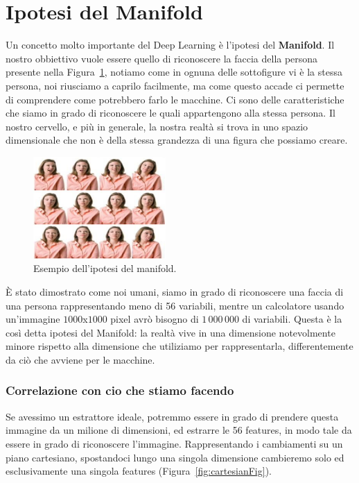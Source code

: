 \section{Ipotesi del Manifold}
Un concetto molto importante del Deep Learning è l'ipotesi del \textbf{Manifold}. Il nostro obbiettivo vuole essere quello di riconoscere la faccia della persona presente nella Figura~\ref{fig:manifold}, notiamo come in ognuna delle sottofigure vi è la stessa persona, noi riusciamo a caprilo facilmente, ma come questo accade ci permette di comprendere come potrebbero farlo le macchine. Ci sono delle caratteristiche che siamo in grado di riconoscere le quali appartengono alla stessa persona. Il nostro cervello, e più in generale, la nostra realtà si trova in uno spazio dimensionale che non è della stessa grandezza di una figura che possiamo creare.

\begin{figure}[h]
    \centering
    \includegraphics[width=0.45\textwidth]{figure/Manifold.png}
    \caption{Esempio dell'ipotesi del manifold.}
    \label{fig:manifold}
\end{figure}


È stato dimostrato come noi umani, siamo in grado di riconoscere una faccia di una persona rappresentando meno di 56 variabili, mentre un calcolatore usando un'immagine $1000$x$1000$ pixel avrò bisogno di $1\,000\,000$ di variabili. Questa è la così detta ipotesi del Manifold: la realtà vive in una dimensione notevolmente minore rispetto alla dimensione che utiliziamo per rappresentarla, differentemente da ciò che avviene per le macchine. 

\subsubsection{Correlazione con cio che stiamo facendo}
Se avessimo un estrattore ideale, potremmo essere in grado di prendere questa immagine da un milione di dimensioni, ed estrarre le 56 features, in modo tale da essere in grado di riconoscere l'immagine. Rappresentando i cambiamenti su un piano cartesiano, spostandoci lungo una singola dimensione cambieremo solo ed esclusivamente una singola features (Figura~\ref{fig:cartesianFig}).

